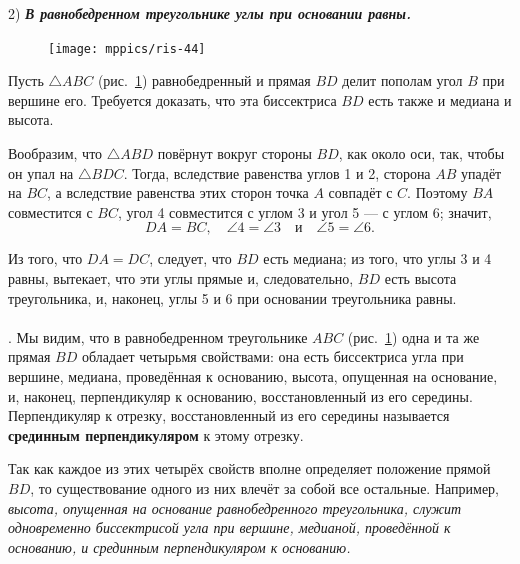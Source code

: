 \documentclass[twoside]{book}
\makeatletter
\newcommand{\rindex}[2][\imki@jobname]{%
  \index[#1]{\detokenize{#2}}%
}
\makeatother
\begin{document}
2) \textbf{\emph{В равнобедренном треугольнике углы при основании равны.}}

\begin{figure}
\centering
\texttt{[image: mppics/ris-44]}
\caption{}\label{1938/ris-44}
\end{figure}


Пусть $\triangle ABC$ (рис.~\ref{1938/ris-44}) равнобедренный и прямая $BD$ делит пополам угол $B$ при вершине его.
Требуется доказать, что эта биссектриса $BD$ есть также и медиана и высота.

Вообразим, что $\triangle ABD$ повёрнут вокруг стороны $BD$, как около оси, так, чтобы он упал на $\triangle BDC$.
Тогда, вследствие равенства углов 1 и 2, сторона $AB$ упадёт на $BC$, а вследствие равенства этих сторон точка $A$ совпадёт с $C$.
Поэтому $BA$ совместится с $BC$, угол 4 совместится с углом 3 и угол 5 — с углом 6;
значит,
\[DA = BC,\quad \angle 4 = \angle 3\quad \text{и}\quad \angle 5 = \angle 6.\]

Из того, что $DA=DC$, следует, что $BD$ есть медиана;
из того, что углы 3 и 4 равны, вытекает, что эти углы прямые и, следовательно, $BD$ есть высота треугольника, и, наконец, углы 5 и 6 при основании треугольника равны.

\paragraph{}\label{1938/39}
.
Мы видим, что в равнобедренном треугольнике $ABC$ (рис.~\ref{1938/ris-44}) одна и та же прямая $BD$ обладает четырьмя свойствами:
она есть биссектриса угла при вершине, медиана, проведённая к основанию, высота, опущенная на основание, и, наконец, перпендикуляр к основанию, восстановленный из его середины. 
Перпендикуляр к отрезку, восстановленный из его середины называется \rindex{срединный перпендикуляр}\textbf{срединным перпендикуляром} к этому отрезку.

Так как каждое из этих четырёх свойств вполне определяет положение прямой $BD$, то существование одного из них влечёт за собой все остальные.
Например, \emph{высота, опущенная на основание равнобедренного треугольника, служит одновременно биссектрисой угла при вершине, медианой, проведённой к основанию, и срединным перпендикуляром к основанию.} 
\end{document}
